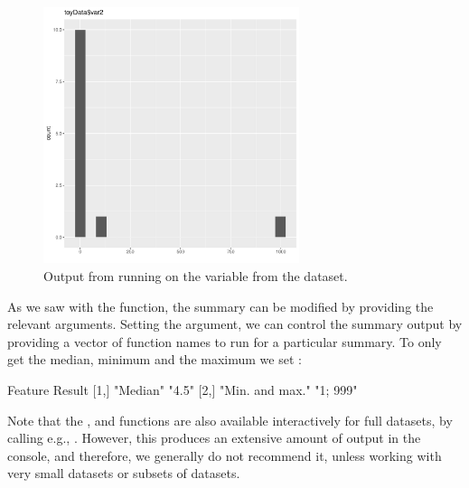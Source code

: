 \documentclass[article,shortnames]{jss}
\newcommand{\hl}[1]{\textcolor{magenta}{#1}}
\begin{document}
\begin{figure}[tb]
\begin{center}
\includegraphics[width=7.5cm]{toyData-var2.pdf}
\end{center}
\caption{Output from running  on the variable  from the
 dataset.}
\label{fig:example2}
\end{figure}


As we saw with the  function, the summary can be modified
by providing the relevant  arguments. Setting the
 argument, we can control the summary output by
providing a vector of function names to run for a particular summary. To
only get the median, minimum and the maximum we set
:

\begin{Schunk}
\begin{Soutput}
     Feature         Result  
[1,] "Median"        "4.5"   
[2,] "Min. and max." "1; 999"
\end{Soutput}
\end{Schunk}

Note that the ,  and  functions are also available interactively for full datasets, by calling e.g., . However, this produces an extensive amount of output in the console, and therefore, we generally do not recommend it, unless working with very small datasets or subsets of datasets.

\end{document}
